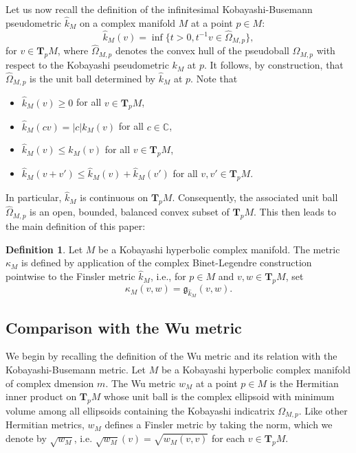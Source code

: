 \documentclass[a4paper,11pt,reqno]{amsart}
\theoremstyle{plain}
\theoremstyle{definition}
\newtheorem{definition}[equation]{Definition}
\theoremstyle{remark}
\theoremstyle{remark}
\numberwithin{equation}{section}
\newcommand{\g}{\mathfrak{g}}
\begin{document}
Let us now recall the definition of the infinitesimal Kobayashi-Busemann pseudometric $ \hat{k}_M $ on a complex manifold $ M $ at a point $ p \in M $:
\[
\hat{k}_M(v) = \inf\{ t > 0, t^{-1} v \in \hat{\Omega}_{M, p}\},
\]
for $ v \in \textbf{T}_p M $, where $ \hat{\Omega}_{M, p} $ denotes the convex hull of the pseudoball $ {\Omega}_{M, p}$ with respect to the Kobayashi pseudometric $ k_M $ at $ p $. It follows, by construction, that $\hat{\Omega}_{M, p} $ is the unit ball determined by $ \hat{k}_M $ at $ p $. Note that
\begin{itemize}
 \item $ \hat{k}_M(v) \geq 0 $ for all $ v \in \textbf{T}_p M$,
 \item $ \hat{k}_M (c v) = |c| k_M(v) $ for all $ c \in \mathbb{C} $,
 \item $ \hat{k}_M (v) \leq k_M (v) $ for all $ v \in \textbf{T}_p M$,
 \item $ \hat{k}_M (v + v') \leq \hat{k}_M(v) + \hat{k}_M(v')$ for all $ v, v' \in \textbf{T}_p M$.
 \end{itemize}
In particular, $ \hat{k}_M $ is continuous on $ \textbf{T}_p M $. Consequently, the associated unit ball $ \hat{\Omega}_{M, p} $ is an open, bounded, balanced convex subset of $ \textbf{T}_p M $. This then leads to the main definition of this paper:
\begin{definition} 
Let $ M $ be a Kobayashi hyperbolic complex manifold. The metric $\kappa_M$ is defined by application of the complex Binet-Legendre construction pointwise to the Finsler metric $ \hat{k}_M$, i.e., for 
     $p\in M$ and $v,w\in \textbf{T}_p M$, set
    \[\kappa_M(v,w)=\g_{ \hat{k}_M}(v,w). \]
\end{definition}

\subsection{Comparison with the Wu metric}

We begin by recalling the definition of the Wu metric and its relation with the Kobayashi-Busemann metric. Let $ M $ be a Kobayashi hyperbolic complex manifold of complex dmension $m$. The Wu metric $ w_M$ at a point $ p \in M $ is the Hermitian inner product on $ \textbf{T}_pM $ whose unit ball is the complex ellipsoid with minimum volume among all ellipsoids containing the Kobayashi indicatrix $ \Omega_{M,p} $. Like other Hermitian metrics, $w_M$ defines a Finsler metric by 
taking the norm, which we denote by $\sqrt{w_M}$, i.e. $\sqrt{w_M}(v)=\sqrt{w_M(v,v)}$ for each $v\in \textbf{T}_pM$.
\end{document}
